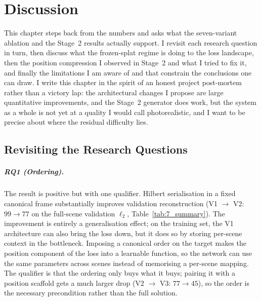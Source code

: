\chapter{Discussion}
\label{chap:discussion}

This chapter steps back from the numbers and asks what the seven-variant ablation and the Stage~2 results actually support. I revisit each research question in turn, then discuss what the frozen-splat regime is doing to the loss landscape, then the position compression I observed in Stage~2 and what I tried to fix it, and finally the limitations I am aware of and that constrain the conclusions one can draw. I write this chapter in the spirit of an honest project post-mortem rather than a victory lap: the architectural changes I propose are large quantitative improvements, and the Stage~2 generator does work, but the system as a whole is not yet at a quality I would call photorealistic, and I want to be precise about where the residual difficulty lies.

\section{Revisiting the Research Questions}
\label{sec:disc_rqs}

\paragraph{RQ1 (Ordering).} The result is positive but with one qualifier. Hilbert serialisation in a fixed canonical frame substantially improves validation reconstruction (V1 $\to$ V2: $99 \to 77$ on the full-scene validation $\ell_2$, Table~\ref{tab:7_summary}). The improvement is entirely a generalisation effect; on the training set, the V1 architecture can also bring the loss down, but it does so by storing per-scene context in the bottleneck. Imposing a canonical order on the target makes the position component of the loss into a learnable function, so the network can use the same parameters across scenes instead of memorising a per-scene mapping. The qualifier is that the ordering only buys what it buys; pairing it with a position scaffold gets a much larger drop (V2 $\to$ V3: $77 \to 45$), so the order is the necessary precondition rather than the full solution.

